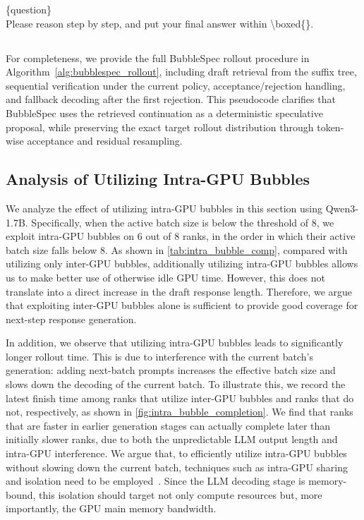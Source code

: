 \begin{tcolorbox}[
    colback=Teal!10!white, 
    colframe=Teal,
    coltitle=Base,
    title = {Chat Template}
]
\{question\}\\
Please reason step by step, and put your final answer within \textbackslash boxed\{\}.
\end{tcolorbox}

\subsection{}
\label{sec:spec_details}

For completeness, we provide the full BubbleSpec rollout procedure in Algorithm~\ref{alg:bubblespec_rollout}, including draft retrieval from the suffix tree, sequential verification under the current policy, acceptance/rejection handling, and fallback decoding after the first rejection. This pseudocode clarifies that BubbleSpec uses the retrieved continuation as a deterministic speculative proposal, while preserving the exact target rollout distribution through token-wise acceptance and residual resampling.




\subsection{Analysis of Utilizing Intra-GPU Bubbles}

We analyze the effect of utilizing intra-GPU bubbles in this section using Qwen3-1.7B. Specifically, when the active batch size is below the threshold of 8, we exploit intra-GPU bubbles on 6 out of 8 ranks, in the order in which their active batch size falls below 8. As shown in \autoref{tab:intra_bubble_comp}, compared with utilizing only inter-GPU bubbles, additionally utilizing intra-GPU bubbles allows us to make better use of otherwise idle GPU time. However, this does not translate into a direct increase in the draft response length. Therefore, we argue that exploiting inter-GPU bubbles alone is sufficient to provide good coverage for next-step response generation.

In addition, we observe that utilizing intra-GPU bubbles leads to significantly longer rollout time. This is due to interference with the current batch’s generation: adding next-batch prompts increases the effective batch size and slows down the decoding of the current batch. To illustrate this, we record the latest finish time among ranks that utilize inter-GPU bubbles and ranks that do not, respectively, as shown in \autoref{fig:intra_bubble_completion}. We find that ranks that are faster in earlier generation stages can actually complete later than initially slower ranks, due to both the unpredictable LLM output length and intra-GPU interference. We argue that, to efficiently utilize intra-GPU bubbles without slowing down the current batch, techniques such as intra-GPU sharing and isolation need to be employed~\cite{nova}. Since the LLM decoding stage is memory-bound, this isolation should target not only compute resources but, more importantly, the GPU main memory bandwidth.



